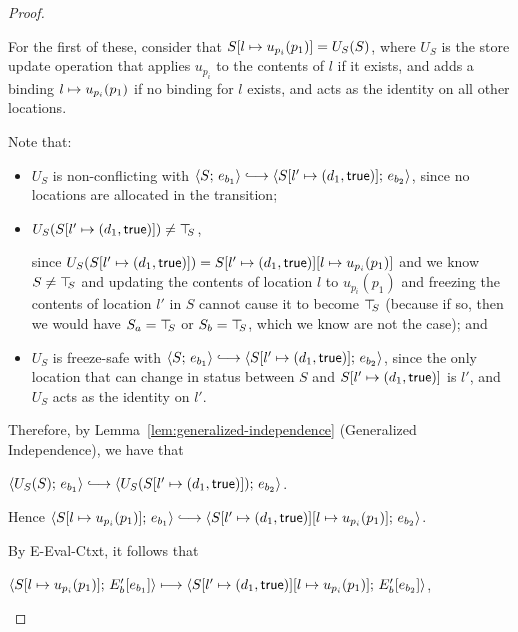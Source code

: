 \begin{proof}
\begin{enumerate}
\begin{enumerate}
\begin{itemize}
        For the first of these, consider that
        $S[l \mapsto u_{p_i}(p_1)] = U_S(S)$, where $U_S$ is the
        store update operation that applies $u_{p_i}$ to the
        contents of $l$ if it exists, and adds a binding
        $l \mapsto u_{p_i}(p_1)$ if no binding for $l$
        exists, and acts as the identity on all other locations.

        Note that:
        \begin{itemize}
        \item $U_S$ is non-conflicting with $\config{S}{e_{b_1}}
          \parstepsto
          \config{\extS{S}{l'}{d_1}{\frozentrue}}{e_{b_2}}$, since
          no locations are allocated in the transition;
        \item $U_S(S[l' \mapsto (d_1, \textsf{true})]) \neq \top\hspace{-0.85mm}_{S}$,

          since $U_S(S[l' \mapsto (d_1, \textsf{true})]) =
          S[l' \mapsto (d_1, \textsf{true})][l \mapsto u_{p_i}(p_1)]$
          and we know $S \neq \top\hspace{-0.85mm}_{S}$ and updating the contents of
          location $l$ to $u_{p_i}(p_1)$ and freezing the contents
          of location $l'$ in $S$ cannot cause it to become $\top\hspace{-0.85mm}_{S}$
          (because if so, then we would have $S_a = \top\hspace{-0.85mm}_{S}$ or $S_b =
          \top\hspace{-0.85mm}_{S}$, which we know are not the case); and
        \item $U_S$ is freeze-safe with $\config{S}{e_{b_1}}
          \parstepsto
          \config{\extS{S}{l'}{d_1}{\frozentrue}}{e_{b_2}}$, since
          the only location that can change in status between $S$
          and $S[l' \mapsto (d_1, \textsf{true})]$ is $l'$, and $U_S$
          acts as the identity on $l'$.
        \end{itemize}
        Therefore, by Lemma~\ref{lem:generalized-independence}
        (Generalized Independence), we have that

        $\config{U_S(S)}{e_{b_1}} \parstepsto
        \config{U_S(\extS{S}{l'}{d_1}{\frozentrue})}{e_{b_2}}$.

        Hence $\config{\extSRaw{S}{l}{u_{p_i}(p_1)}}{e_{b_1}}
        \parstepsto
        \config{\extSRaw{\extS{S}{l'}{d_1}{\frozentrue}}{l}{u_{p_i}(p_1)}}{e_{b_2}}$.

        By {\sc E-Eval-Ctxt}, it follows that

        $\langle S[l \mapsto u_{p_i}(p_1)];\, E'_b\hspace{-0.5mm}\left[e_{b_1}\right] \rangle
        \longmapsto
        \langle S[l' \mapsto (d_1, \textsf{true})][l \mapsto u_{p_i}(p_1)];\, E'_b\hspace{-0.5mm}\left[e_{b_2}\right] \rangle$,
        

\end{itemize}
\end{enumerate}
\end{enumerate}
\end{proof}
